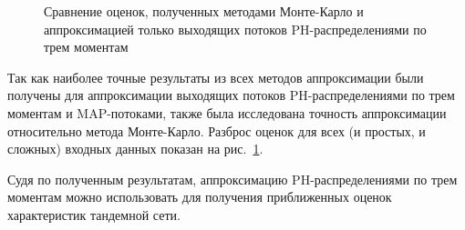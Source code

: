 \begin{figure}[h]
  \caption{Сравнение оценок, полученных методами Монте-Карло и аппроксимацией только выходящих потоков PH-распределениями по трем моментам}
  \label{fig:ch4_scatter_monte_carlo_vs_ph3}
\end{figure}

Так как наиболее точные результаты из всех методов аппроксимации были получены для аппроксимации выходящих потоков PH-распределениями по трем моментам и MAP-потоками, также была исследована точность аппроксимации относительно метода Монте-Карло. Разброс оценок для всех (и простых, и сложных) входных данных показан на рис.~\ref{fig:ch4_scatter_monte_carlo_vs_ph3}.

Судя по полученным результатам, аппроксимацию PH-распределениями по трем моментам можно использовать для получения приближенных оценок характеристик тандемной сети.






